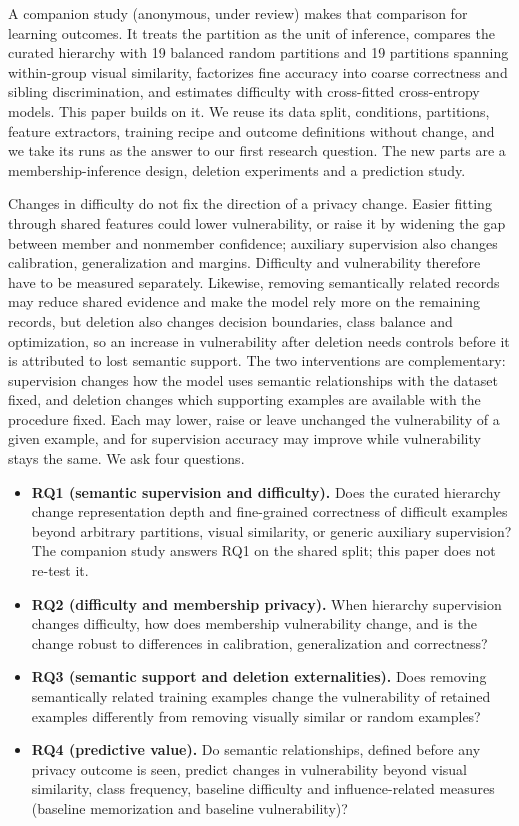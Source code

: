 \documentclass{article} %
\begin{document}
A companion study (anonymous, under review) makes that comparison for learning outcomes. It treats the partition as the unit of inference, compares the curated hierarchy with 19 balanced random partitions and 19 partitions spanning within-group visual similarity, factorizes fine accuracy into coarse correctness and sibling discrimination, and estimates difficulty with cross-fitted cross-entropy models. This paper builds on it. We reuse its data split, conditions, partitions, feature extractors, training recipe and outcome definitions without change, and we take its runs as the answer to our first research question. The new parts are a membership-inference design, deletion experiments and a prediction study.

Changes in difficulty do not fix the direction of a privacy change. Easier fitting through shared features could lower vulnerability, or raise it by widening the gap between member and nonmember confidence; auxiliary supervision also changes calibration, generalization and margins. Difficulty and vulnerability therefore have to be measured separately. Likewise, removing semantically related records may reduce shared evidence and make the model rely more on the remaining records, but deletion also changes decision boundaries, class balance and optimization, so an increase in vulnerability after deletion needs controls before it is attributed to lost semantic support. The two interventions are complementary: supervision changes how the model uses semantic relationships with the dataset fixed, and deletion changes which supporting examples are available with the procedure fixed. Each may lower, raise or leave unchanged the vulnerability of a given example, and for supervision accuracy may improve while vulnerability stays the same. We ask four questions.

\begin{itemize}\setlength{\itemsep}{1pt}\setlength{\parskip}{0pt}
  \item \textbf{RQ1 (semantic supervision and difficulty).} Does the curated hierarchy change representation depth and fine-grained correctness of difficult examples beyond arbitrary partitions, visual similarity, or generic auxiliary supervision? The companion study answers RQ1 on the shared split; this paper does not re-test it.
  \item \textbf{RQ2 (difficulty and membership privacy).} When hierarchy supervision changes difficulty, how does membership vulnerability change, and is the change robust to differences in calibration, generalization and correctness?
  \item \textbf{RQ3 (semantic support and deletion externalities).} Does removing semantically related training examples change the vulnerability of retained examples differently from removing visually similar or random examples?
  \item \textbf{RQ4 (predictive value).} Do semantic relationships, defined before any privacy outcome is seen, predict changes in vulnerability beyond visual similarity, class frequency, baseline difficulty and influence-related measures (baseline memorization and baseline vulnerability)?
\end{itemize}
\end{document}
